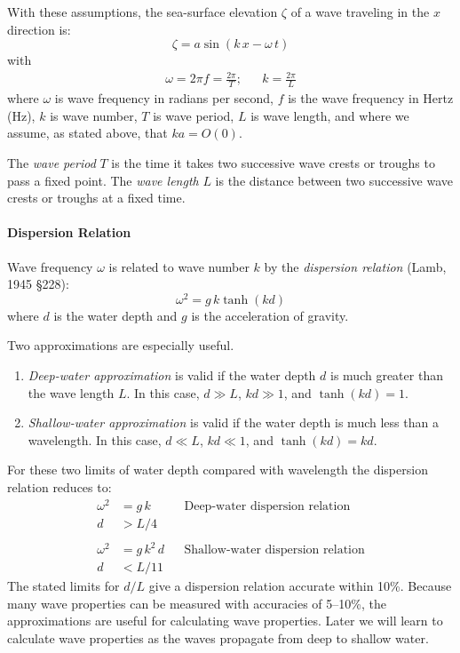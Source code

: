 With these assumptions, the sea-surface elevation $\zeta$ of a wave
traveling in the $x$ direction is:
\begin{equation}
\zeta = a \sin (k \, x - \omega \, t)
\end{equation}
with
\begin{eqnarray}
\omega = 2 \pi f = \frac{2 \pi}{T}; & & k = \frac{2 \pi}{L}
\end{eqnarray}
where $\omega$ is wave frequency in radians per second, $f$ is the
wave frequency in Hertz (Hz), $k$ is wave number, $T$ is wave period,
$L$ is wave length, and where we assume, as stated above, that $ka = O(0)$.

The \textit{wave period} $T$ is the time it
takes two successive wave crests or troughs to pass a fixed point. The
\textit{wave length} $L$ is the distance
between two successive wave crests or troughs at a fixed time.


\paragraph{Dispersion Relation}
Wave frequency $\omega$ is related to wave number
$k$ by the \textit{dispersion relation} (Lamb, 1945 \S{228}):
\begin{equation}
\omega ^{2} = g \, k \tanh (k d)
\end{equation}
where $d$ is the water depth and $g$ is the acceleration of gravity.

Two approximations are especially useful.
\begin{enumerate}
\item \textit{Deep-water approximation} is valid if the water depth
$d$ is much greater than the wave length $L$. In this case, $d \gg L$,
$kd \gg 1$, and $\tanh (kd) = 1$.

\item \textit{Shallow-water approximation} is valid if the water depth
is much less than a wavelength. In this case, $d \ll L$, $kd \ll 1$,
and $\tanh (kd) = kd$.
\end{enumerate}
For these two limits of water depth compared with wavelength the
dispersion relation reduces to:
\begin{align}
  \omega ^2 &= g \, k & & \text{Deep-water dispersion relation}\\
  d &> L/4 & &  \nonumber \\
   & & \nonumber \\
  \omega ^2 &= g \, k^{2} \, d & & \text{Shallow-water dispersion relation}\\
   d &< L/11 & & \nonumber
\end{align}
The stated limits for $d/L$ give a dispersion relation accurate within
10\%.  Because many wave properties can be measured with accuracies of
5--10\%, the approximations are useful for calculating wave
properties. Later we will learn to calculate wave properties as the
waves propagate from deep to shallow water.

